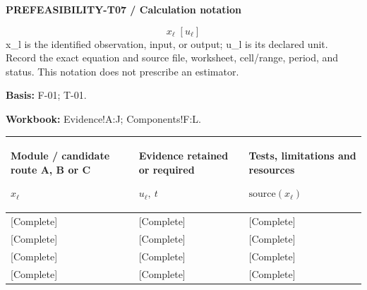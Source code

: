 \par\begingroup\sffamily\fontsize{8}{10}\selectfont\color{NEBGreen}\setlength{\parskip}{2pt}\setlength{\abovedisplayskip}{4pt}\setlength{\belowdisplayskip}{4pt}\setlength{\abovedisplayshortskip}{2pt}\setlength{\belowdisplayshortskip}{3pt}
\textbf{PREFEASIBILITY-T07 / Calculation notation}\par
{\fontsize{9}{11}\selectfont\[ x_{\ell}\;[u_{\ell}] \]}
x\_l is the identified observation, input, or output; u\_l is its declared unit. Record the exact equation and source file, worksheet, cell/range, period, and status. This notation does not prescribe an estimator.\par
\textbf{Basis:} F-01; T-01.\par
\textbf{Workbook:} Evidence!A:J; Components!F:L.\par\endgroup
{\sffamily\fontsize{8.3}{10.3}\selectfont\begin{longtable}{@{}P{51.14mm} P{56.09mm} P{57.74mm}@{}}
\toprule
\textbf{Module / candidate route A, B or C}\par {\normalfont\fontsize{8.2}{10}\selectfont $x_{\ell}$} & \textbf{Evidence retained or required}\par {\normalfont\fontsize{8.2}{10}\selectfont $u_{\ell},\ t$} & \textbf{Tests, limitations and resources}\par {\normalfont\fontsize{8.2}{10}\selectfont $\text{source}(x_{\ell})$}\\\midrule\endhead
\rule{0pt}{7.7mm}[Complete] & [Complete] & [Complete]\\\hline
\rule{0pt}{7.7mm}[Complete] & [Complete] & [Complete]\\\hline
\rule{0pt}{7.7mm}[Complete] & [Complete] & [Complete]\\\hline
\rule{0pt}{7.7mm}[Complete] & [Complete] & [Complete]\\\hline
\end{longtable}}
\par\begingroup\sffamily\fontsize{8}{10}\selectfont\color{NEBGreen}\setlength{\parskip}{2pt}\setlength{\abovedisplayskip}{4pt}\setlength{\belowdisplayskip}{4pt}\setlength{\abovedisplayshortskip}{2pt}\setlength{\belowdisplayshortskip}{3pt}
